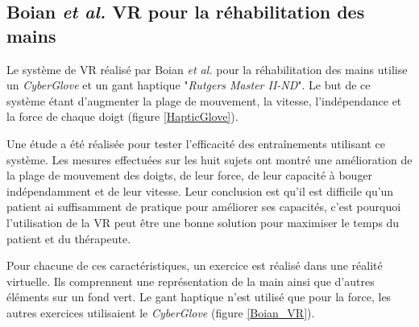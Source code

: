 	\subsection*{Boian \textit{et al.} VR pour la réhabilitation des mains}
		Le système de VR réalisé par Boian \textit{et al.} pour la réhabilitation des mains \cite{Boian_HandRehab} utilise un \textit{CyberGlove} et un gant haptique "\textit{Rutgers Master II-ND}". Le but de ce système étant d'augmenter la plage de mouvement, la vitesse, l'indépendance et la force de chaque doigt (figure \ref{HapticGlove}).
		
		Une étude a été réalisée \cite{MeriansSensorimotorTraining} pour tester l'efficacité des entraînements utilisant ce système. Les mesures effectuées sur les huit sujets ont montré une amélioration de la plage de mouvement des doigts, de leur force, de leur capacité à bouger indépendamment et de leur vitesse. Leur conclusion est qu'il est difficile qu'un patient ai suffisamment de pratique pour améliorer ses capacités, c'est pourquoi l'utilisation de la VR peut être une bonne solution pour maximiser le temps du patient et du thérapeute.


		\begin{minipage}{\linewidth}
			\label{HapticGlove}
		\end{minipage}\medskip
		
		Pour chacune de ces caractéristiques, un exercice est réalisé dans une réalité virtuelle. Ils comprennent une représentation de la main ainsi que d'autres éléments sur un fond vert. Le gant haptique n'est utilisé que pour la force, les autres exercices utilisaient le \textit{CyberGlove} (figure \ref{Boian_VR}).
		
